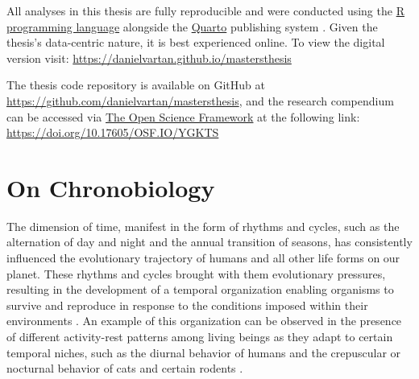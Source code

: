 \documentclass[
12pt,
openright,
oneside,
a4paper,
chapter=TITLE,
section=TITLE,
french,
spanish,
brazil,
english
]{abntex2}
\begin{document}
All analyses in this thesis are fully reproducible and were conducted
using the \href{https://www.r-project.org/}{R programming language}
\autocite{rcoreteama} alongside the \href{https://quarto.org/}{Quarto}
publishing system \autocite{allaire}. Given the thesis's data-centric
nature, it is best experienced online. To view the digital version
visit: \url{https://danielvartan.github.io/mastersthesis}

The thesis code repository is available on GitHub at
\url{https://github.com/danielvartan/mastersthesis}, and the research
compendium can be accessed via \href{https://osf.io/}{The Open Science
Framework} at the following link:
\url{https://doi.org/10.17605/OSF.IO/YGKTS}


\chapter{On Chronobiology}\label{sec-on-chronobiology}

The dimension of time, manifest in the form of rhythms and cycles, such
as the alternation of day and night and the annual transition of
seasons, has consistently influenced the evolutionary trajectory of
humans and all other life forms on our planet. These rhythms and cycles
brought with them evolutionary pressures, resulting in the development
of a temporal organization enabling organisms to survive and reproduce
in response to the conditions imposed within their environments
\autocite{pittendrigh1981,aschoff1989,pittendrigh1993,paranjpe2005}. An
example of this organization can be observed in the presence of
different activity-rest patterns among living beings as they adapt to
certain temporal niches, such as the diurnal behavior of humans and the
crepuscular or nocturnal behavior of cats and certain rodents
\autocite{aschoff1989a,kronfeld-schor2017}.
\end{document}
